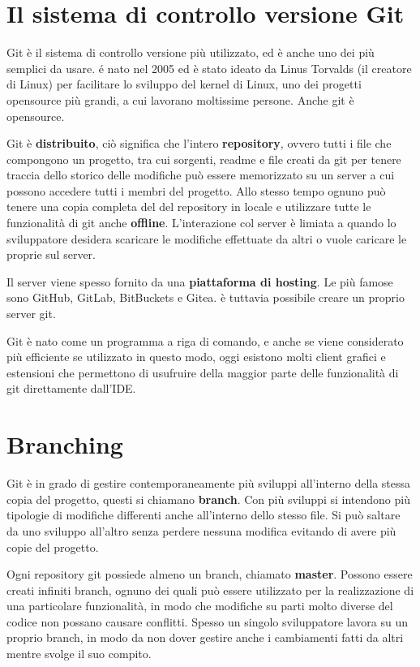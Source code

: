 \documentclass{article} \usepackage[textwidth=19cm,textheight=24cm]{geometry}
\begin{document}
\section{Il sistema di controllo versione Git}

Git è il sistema di controllo versione più utilizzato, ed è anche uno dei più
semplici da usare. é nato nel 2005 ed è stato ideato da Linus Torvalds (il
creatore di Linux) per facilitare lo sviluppo del kernel di Linux, uno dei
progetti opensource più grandi, a cui lavorano moltissime persone. Anche git è
opensource.

Git è \textbf{distribuito}, ciò significa che l'intero \textbf{repository}, ovvero
tutti i file che compongono un progetto, tra cui sorgenti, readme e file creati
da git per tenere traccia dello storico delle modifiche può essere memorizzato
su un server a cui possono accedere tutti i membri del progetto. Allo stesso
tempo ognuno può tenere una copia completa del del repository in locale e
utilizzare tutte le funzionalità di git anche \textbf{offline}. L'interazione col server
è limiata a quando lo sviluppatore desidera scaricare le modifiche effettuate da
altri o vuole caricare le proprie sul server.

Il server viene spesso fornito da una \textbf{piattaforma di hosting}. Le più
famose sono GitHub, GitLab, BitBuckets e Gitea. è tuttavia possibile creare un
proprio server git.

Git è nato come un programma a riga di comando, e anche se viene considerato più
efficiente se utilizzato in questo modo, oggi esistono molti client grafici e
estensioni che permettono di usufruire della maggior parte delle funzionalità di
git direttamente dall'IDE.

\section{Branching}

Git è in grado di gestire contemporaneamente più sviluppi all'interno della
stessa copia del progetto, questi si chiamano \textbf{branch}. Con più sviluppi si 
intendono più tipologie di modifiche differenti anche all'interno dello stesso file.
Si può saltare da uno sviluppo all'altro senza perdere nessuna modifica
evitando di avere più copie del progetto.

Ogni repository git possiede almeno un branch, chiamato \textbf{master}.
Possono essere creati infiniti branch, ognuno dei quali può essere utilizzato
per la realizzazione di una particolare funzionalità, in modo che modifiche su parti
molto diverse del codice non possano causare conflitti. Spesso un singolo
sviluppatore lavora su un proprio branch, in modo da non dover gestire anche i
cambiamenti fatti da altri mentre svolge il suo compito. 
\end{document}
